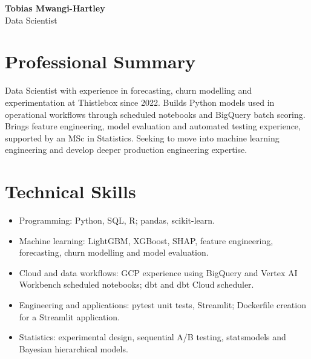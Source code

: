 \documentclass[11pt,a4paper]{article}
\newcommand{\cvsection}[1]{\section*{#1}}
\begin{document}
{\LARGE\bfseries\color{primarycolor} Tobias Mwangi-Hartley}\\[0.2em]
{\large\color{accentcolor} Data Scientist}

\cvsection{Professional Summary}
Data Scientist with experience in forecasting, churn modelling and experimentation at Thistlebox since 2022. Builds Python models used in operational workflows through scheduled notebooks and BigQuery batch scoring. Brings feature engineering, model evaluation and automated testing experience, supported by an MSc in Statistics. Seeking to move into machine learning engineering and develop deeper production engineering expertise.

\cvsection{Technical Skills}
\begin{itemize}
\item Programming: Python, SQL, R; pandas, scikit-learn.
\item Machine learning: LightGBM, XGBoost, SHAP, feature engineering, forecasting, churn modelling and model evaluation.
\item Cloud and data workflows: GCP experience using BigQuery and Vertex AI Workbench scheduled notebooks; dbt and dbt Cloud scheduler.
\item Engineering and applications: pytest unit tests, Streamlit; Dockerfile creation for a Streamlit application.
\item Statistics: experimental design, sequential A/B testing, statsmodels and Bayesian hierarchical models.
\end{itemize}
\end{document}
